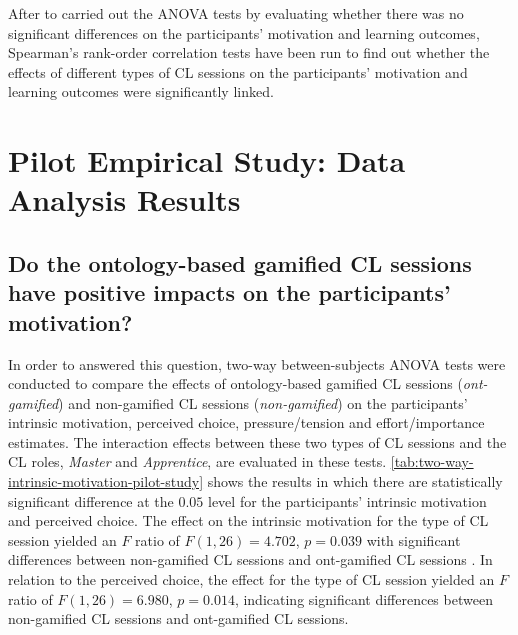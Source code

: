 After to carried out the ANOVA tests by evaluating whether there was no significant differences on the participants' motivation and learning outcomes, Spearman's rank-order correlation tests have been run to find out whether the effects of different types of CL sessions on the participants' motivation and learning outcomes were significantly linked.


\section{Pilot Empirical Study: Data Analysis Results}
\label{sec:pilot-study}

\subsection*{Do the ontology-based gamified CL sessions have positive impacts on the participants' motivation?}

In order to answered this question, two-way between-subjects ANOVA tests were conducted to compare the effects of ontology-based gamified CL sessions (\emph{ont-gamified}) and non-gamified CL sessions (\emph{non-gamified}) on the participants' intrinsic motivation, perceived choice, pressure/tension and effort/importance estimates. The interaction effects between these two types of CL sessions and the CL roles, \emph{Master} and \emph{Apprentice}, are evaluated in these tests. \autoref{tab:two-way-intrinsic-motivation-pilot-study}  shows the results in which there are statistically significant difference at the $0.05$ level for the participants' intrinsic motivation and perceived choice. The effect on the intrinsic motivation for the type of CL session yielded an $F$ ratio of $F(1,26) = 4.702$, $p = 0.039$ with significant differences between non-gamified CL sessions and ont-gamified CL sessions . In relation to the perceived choice, the effect for the type of CL session yielded an $F$ ratio of $F(1,26) = 6.980$, $p = 0.014$, indicating significant differences between non-gamified CL sessions and ont-gamified CL sessions.

